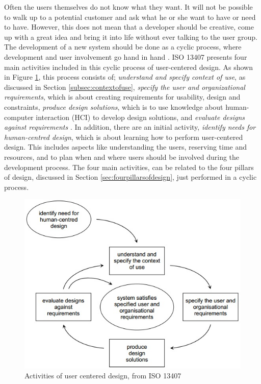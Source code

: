 Often the users themselves do not know what they want. It will not be possible to walk up to a potential customer and ask what he or she want to have or need to have. However, this does not mean that a developer should be creative, come up with a great idea and bring it into life without ever talking to the user group. The development of a new system should be done as a cyclic process, where development and user involvement go hand in hand \cite{mmi}. ISO 13407 presents four main activities included in this cyclic process of user-centered design. As shown in Figure \ref{userdesign}, this process consists of; \emph{understand and specify context of use}, as discussed in Section \ref{subsec:contextofuse}, \emph{specify the user and organizational requirements}, which is about creating requirements for usability, design and constraints, \emph{produce design solutions}, which is to use knowledge about human-computer interaction (HCI) to develop design solutions, and \emph{evaluate designs against requirements} \cite{jokela2003standard}. In addition, there are an initial activity, \emph{identify needs for human-centred design}, which is about learning how to perform user-centered design. This includes aspects like understanding the users, reserving time and resources, and to plan when and where users should be involved during the development process. The four main activities, can be related to the four pillars of design, discussed in Section \ref{sec:fourpillarsofdesign}, just performed in a cyclic process. 

\begin{figure} [H]
\centering
\includegraphics[scale=0.7]{userCenteredDesign.jpg}
\caption[User centered design]{Activities of user centered design, from ISO 13407 \cite{jokela2003standard}}
\label{userdesign}
\end{figure}



